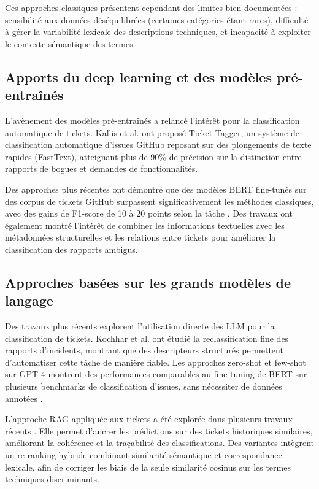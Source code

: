 Ces approches classiques présentent cependant des limites bien documentées : sensibilité aux données déséquilibrées (certaines catégories étant rares), difficulté à gérer la variabilité lexicale des descriptions techniques, et incapacité à exploiter le contexte sémantique des termes.

\subsection{Apports du deep learning et des modèles pré-entraînés}

L'avènement des modèles pré-entraînés a relancé l'intérêt pour la classification automatique de tickets. Kallis et al. \cite{logo:kallis2019} ont proposé Ticket Tagger, un système de classification automatique d'issues GitHub reposant sur des plongements de texte rapides (FastText), atteignant plus de 90\% de précision sur la distinction entre rapports de bogues et demandes de fonctionnalités.

Des approches plus récentes ont démontré que des modèles BERT fine-tunés sur des corpus de tickets GitHub surpassent significativement les méthodes classiques, avec des gains de F1-score de 10 à 20 points selon la tâche \cite{logo:bert_bug}. Des travaux ont également montré l'intérêt de combiner les informations textuelles avec les métadonnées structurelles et les relations entre tickets pour améliorer la classification des rapports ambigus.

\subsection{Approches basées sur les grands modèles de langage}

Des travaux plus récents explorent l'utilisation directe des LLM pour la classification de tickets. Kochhar et al. \cite{logo:kochhar2014} ont étudié la reclassification fine des rapports d'incidents, montrant que des descripteurs structurés permettent d'automatiser cette tâche de manière fiable. Les approches zero-shot et few-shot sur GPT-4 montrent des performances comparables au fine-tuning de BERT sur plusieurs benchmarks de classification d'issues, sans nécessiter de données annotées \cite{logo:llm_bug_report}.

L'approche RAG appliquée aux tickets a été explorée dans plusieurs travaux récents \cite{logo:advanced_rag}. Elle permet d'ancrer les prédictions sur des tickets historiques similaires, améliorant la cohérence et la traçabilité des classifications. Des variantes intègrent un re-ranking hybride combinant similarité sémantique et correspondance lexicale, afin de corriger les biais de la seule similarité cosinus sur les termes techniques discriminants.

